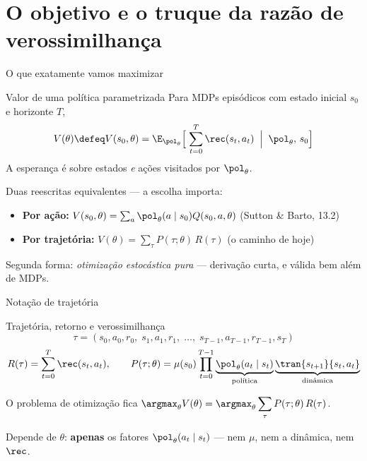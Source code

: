 \documentclass[aspectratio=169, 11pt]{beamer}
\newcommand{\thv}{\theta}                       %
\newcommand{\polth}{\pol_{\thv}}                %
\newcommand{\traj}{\tau}                        %
\newcommand{\Rtraj}{R(\traj)}
\newcommand{\Ptraj}{P(\traj;\thv)}
\begin{document}
\section{O objetivo e o truque da razão de verossimilhança}

\begin{frame}{O que exatamente vamos maximizar}

  \begin{defbox}{Valor de uma política parametrizada}
    Para MDPs episódicos com estado inicial $s_0$ e horizonte $T$,
    \[
      V(\thv) \defeq V(s_0,\thv)
      = \E_{\polth}\Bigl[\; \sum_{t=0}^{T} \rec(s_t,a_t) \;\Bigm|\; \polth,\, s_0 \Bigr]
    \]
    \vspace{-0.6em}
    A esperança é sobre estados \emph{e} ações visitados por $\polth$.
  \end{defbox}

  Duas reescritas equivalentes --- a escolha importa:
  \begin{itemize}\setlength{\itemsep}{0.2ex}
    \item \textbf{Por ação:} $V(s_0,\thv) = \sum_a \polth(a\mid s_0) Q(s_0,a,\thv)$
      \hfill{\scriptsize (Sutton \& Barto, 13.2)}
    \item \textbf{Por trajetória:} $V(\thv) = \sum_{\traj} \Ptraj\, \Rtraj$
      \hfill{\scriptsize (o caminho de hoje)}
  \end{itemize}
  \vspace{-0.3em}

  \vspace{-0.6em}
  \begin{ideiabox}
    Segunda forma: \emph{otimização estocástica pura} --- derivação curta, e
    válida bem além de MDPs.
  \end{ideiabox}
\end{frame}

\begin{frame}{Notação de trajetória}

  \begin{defbox}{Trajetória, retorno e verossimilhança}
    \[
      \traj = (s_0,a_0,r_0,\; s_1,a_1,r_1,\; \dots,\; s_{T-1},a_{T-1},r_{T-1},s_T)
    \]
    \[
      \Rtraj = \sum_{t=0}^{T} \rec(s_t,a_t),
      \qquad
      \Ptraj = \mu(s_0) \prod_{t=0}^{T-1}
        \underbrace{\polth(a_t\mid s_t)}_{\text{política}}
        \underbrace{\tran{s_{t+1}}{s_t,a_t}}_{\text{dinâmica}}
    \]
  \end{defbox}

  O problema de otimização fica
  $\displaystyle \argmax_{\thv} V(\thv) = \argmax_{\thv} \sum_{\traj} \Ptraj\, \Rtraj$.
  \smallskip

  \begin{alertabox}
    Depende de $\thv$: \textbf{apenas} os fatores $\polth(a_t\mid s_t)$ ---
    nem $\mu$, nem a dinâmica, nem $\rec$.
  \end{alertabox}
\end{frame}
\end{document}
